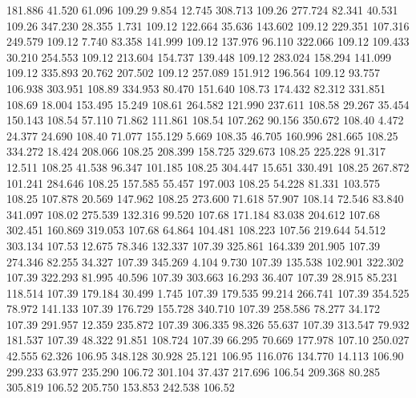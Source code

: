  181.886   41.520   61.096       109.29
   9.854   12.745  308.713       109.26
 277.724   82.341   40.531       109.26
 347.230   28.355    1.731       109.12
 122.664   35.636  143.602       109.12
 229.351  107.316  249.579       109.12
   7.740   83.358  141.999       109.12
 137.976   96.110  322.066       109.12
 109.433   30.210  254.553       109.12
 213.604  154.737  139.448       109.12
 283.024  158.294  141.099       109.12
 335.893   20.762  207.502       109.12
 257.089  151.912  196.564       109.12
  93.757  106.938  303.951       108.89
 334.953   80.470  151.640       108.73
 174.432   82.312  331.851       108.69
  18.004  153.495   15.249       108.61
 264.582  121.990  237.611       108.58
  29.267   35.454  150.143       108.54
  57.110   71.862  111.861       108.54
 107.262   90.156  350.672       108.40
   4.472   24.377   24.690       108.40
  71.077  155.129    5.669       108.35
  46.705  160.996  281.665       108.25
 334.272   18.424  208.066       108.25
 208.399  158.725  329.673       108.25
 225.228   91.317   12.511       108.25
  41.538   96.347  101.185       108.25
 304.447   15.651  330.491       108.25
 267.872  101.241  284.646       108.25
 157.585   55.457  197.003       108.25
  54.228   81.331  103.575       108.25
 107.878   20.569  147.962       108.25
 273.600   71.618   57.907       108.14
  72.546   83.840  341.097       108.02
 275.539  132.316   99.520       107.68
 171.184   83.038  204.612       107.68
 302.451  160.869  319.053       107.68
  64.864  104.481  108.223       107.56
 219.644   54.512  303.134       107.53
  12.675   78.346  132.337       107.39
 325.861  164.339  201.905       107.39
 274.346   82.255   34.327       107.39
 345.269    4.104    9.730       107.39
 135.538  102.901  322.302       107.39
 322.293   81.995   40.596       107.39
 303.663   16.293   36.407       107.39
  28.915   85.231  118.514       107.39
 179.184   30.499    1.745       107.39
 179.535   99.214  266.741       107.39
 354.525   78.972  141.133       107.39
 176.729  155.728  340.710       107.39
 258.586   78.277   34.172       107.39
 291.957   12.359  235.872       107.39
 306.335   98.326   55.637       107.39
 313.547   79.932  181.537       107.39
  48.322   91.851  108.724       107.39
  66.295   70.669  177.978       107.10
 250.027   42.555   62.326       106.95
 348.128   30.928   25.121       106.95
 116.076  134.770   14.113       106.90
 299.233   63.977  235.290       106.72
 301.104   37.437  217.696       106.54
 209.368   80.285  305.819       106.52
 205.750  153.853  242.538       106.52
